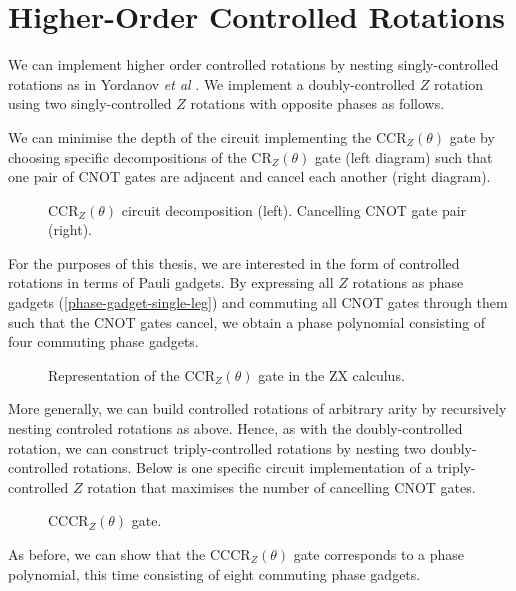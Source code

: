 \section{Higher-Order Controlled Rotations}

We can implement higher order controlled rotations by nesting singly-controlled rotations as in Yordanov \textit{et al} \cite{Yordanov2020}. We implement a doubly-controlled $Z$ rotation using two singly-controlled $Z$ rotations with opposite phases as follows.


We can minimise the depth of the circuit implementing the CCR$_Z(\theta)$ gate by choosing specific decompositions of the CR$_Z(\theta)$ gate (left diagram) such that one pair of CNOT gates are adjacent and cancel each another (right diagram).

\begin{figure}[H]
    \centering
    \caption{CCR$_Z(\theta)$ circuit decomposition (left). Cancelling CNOT gate pair (right).}
\end{figure}

For the purposes of this thesis, we are interested in the form of controlled rotations in terms of Pauli gadgets. By expressing all $Z$ rotations as phase gadgets (\ref{phase-gadget-single-leg}) and commuting all CNOT gates through them such that the CNOT gates cancel, we obtain a phase polynomial consisting of four commuting phase gadgets.

\begin{figure}[H]
    \centering
    \caption{Representation of the CCR$_Z(\theta)$ gate in the ZX calculus.}
    \label{ccrz}
\end{figure}

More generally, we can build controlled rotations of arbitrary arity by recursively nesting controled rotations as above. Hence, as with the doubly-controlled rotation, we can construct triply-controlled rotations by nesting two doubly-controlled rotations. Below is one specific circuit implementation of a triply-controlled $Z$ rotation that maximises the number of cancelling CNOT gates.

\begin{figure}[H]
    \centering
    \caption{CCCR$_Z(\theta)$ gate.}
\end{figure}

As before, we can show that the CCCR$_Z(\theta)$ gate corresponds to a phase polynomial, this time consisting of eight commuting phase gadgets.

